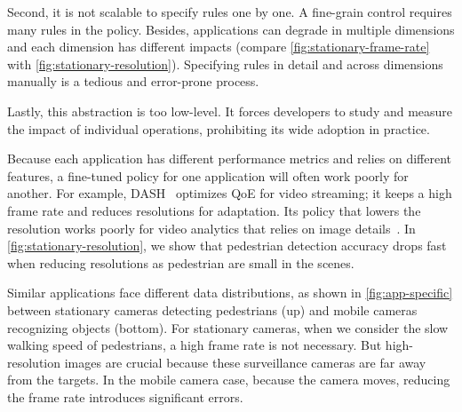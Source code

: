 Second, it is not scalable to specify rules one by one. A fine-grain control
requires many rules in the policy. Besides, applications can degrade in multiple
dimensions and each dimension has different impacts (compare
\autoref{fig:stationary-frame-rate} with \autoref{fig:stationary-resolution}).
Specifying rules in detail and across dimensions manually is a tedious and
error-prone process.

Lastly, this abstraction is too low-level. It forces developers to study and
measure the impact of individual operations, prohibiting its wide adoption in
practice.

 Because each
application has different performance metrics and relies on different features,
a fine-tuned policy for one application will often work poorly for another. For
example, DASH~\cite{sodagar2011mpeg} optimizes QoE for video streaming; it keeps
a high frame rate and reduces resolutions for adaptation. Its policy that lowers
the resolution works poorly for video analytics that relies on image
details~\cite{lowe2004distinctive, viola2001rapid}. In
\autoref{fig:stationary-resolution}, we show that pedestrian detection accuracy
drops fast when reducing resolutions as pedestrian are small in the scenes.

Similar applications face different data distributions, as shown in
\autoref{fig:app-specific} between stationary cameras detecting pedestrians (up)
and mobile cameras recognizing objects (bottom). For stationary cameras, when we
consider the slow walking speed of pedestrians, a high frame rate is not
necessary. But high-resolution images are crucial because these surveillance
cameras are far away from the targets. In the mobile camera case, because the
camera moves, reducing the frame rate introduces significant errors.


